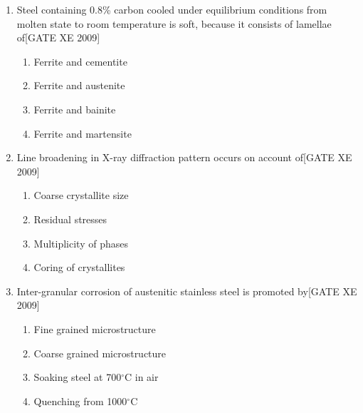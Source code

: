 \documentclass[journal,12pt,onecolumn]{IEEEtran}
\theoremstyle{remark}
\begin{document}
\begin{enumerate}
\begin{enumerate}
\vspace{0.3cm}

\item[\textbf{Q.2}] Steel containing 0.8\% carbon cooled under equilibrium conditions from molten state to room temperature is soft, because it consists of lamellae of\hfill[GATE XE 2009]

\begin{multicols}{2}
\begin{enumerate}
    \item Ferrite and cementite
    \item Ferrite and austenite
    \item Ferrite and bainite
    \item Ferrite and martensite
\end{enumerate}
\end{multicols}

\vspace{0.3cm}

\item[\textbf{Q.3}] Line broadening in X-ray diffraction pattern occurs on account of\hfill[GATE XE 2009]

\begin{multicols}{2}
\begin{enumerate}
    \item Coarse crystallite size
    \item Residual stresses
    \item Multiplicity of phases
    \item Coring of crystallites
\end{enumerate}
\end{multicols}

\vspace{0.3cm}

\item[\textbf{Q.4}] Inter-granular corrosion of austenitic stainless steel is promoted by\hfill[GATE XE 2009]

\begin{multicols}{2}
\begin{enumerate}
    \item Fine grained microstructure
    \item Coarse grained microstructure
    \item Soaking steel at 700$^\circ$C in air
    \item Quenching from 1000$^\circ$C
\end{enumerate}
\end{multicols}


\end{enumerate}
\end{enumerate}
\end{document}
